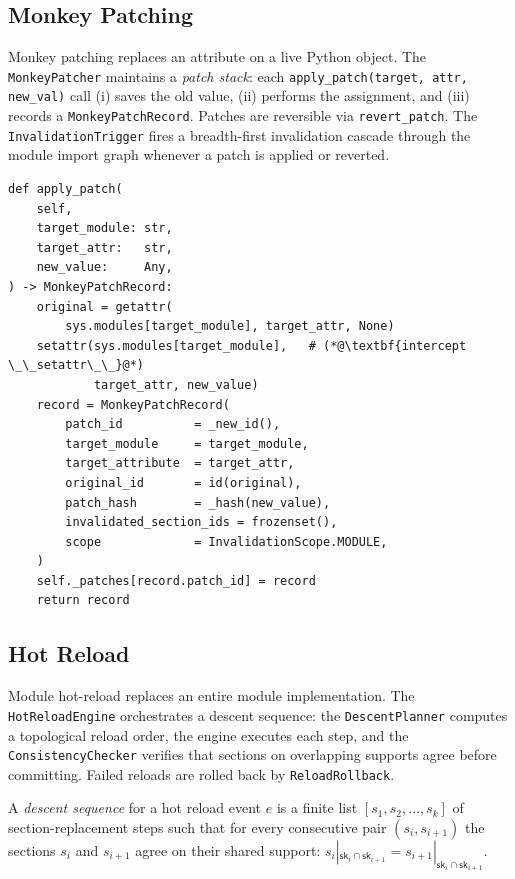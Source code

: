 \documentclass[11pt]{article}
\newcommand{\SuppKey}{\mathsf{sk}}               %
\begin{document}
\subsection{Monkey Patching}
\label{subsec:monkey}

Monkey patching replaces an attribute on a live Python object.  The
\texttt{MonkeyPatcher} maintains a \emph{patch stack}: each
\texttt{apply\_patch(target, attr, new\_val)} call (i) saves the old
value, (ii) performs the assignment, and (iii) records a
\texttt{MonkeyPatchRecord}.  Patches are reversible via
\texttt{revert\_patch}.  The \texttt{InvalidationTrigger} fires a
breadth-first invalidation cascade through the module import graph
whenever a patch is applied or reverted.

\begin{lstlisting}[style=jugeo-python,
    caption={MonkeyPatcher.apply\_patch (monkey\_patching.py, abridged)}]
def apply_patch(
    self,
    target_module: str,
    target_attr:   str,
    new_value:     Any,
) -> MonkeyPatchRecord:
    original = getattr(
        sys.modules[target_module], target_attr, None)
    setattr(sys.modules[target_module],   # (*@\textbf{intercept \_\_setattr\_\_}@*)
            target_attr, new_value)
    record = MonkeyPatchRecord(
        patch_id          = _new_id(),
        target_module     = target_module,
        target_attribute  = target_attr,
        original_id       = id(original),
        patch_hash        = _hash(new_value),
        invalidated_section_ids = frozenset(),
        scope             = InvalidationScope.MODULE,
    )
    self._patches[record.patch_id] = record
    return record
\end{lstlisting}

\subsection{Hot Reload}
\label{subsec:reload}

Module hot-reload replaces an entire module implementation.  The
\texttt{HotReloadEngine} orchestrates a descent sequence: the
\texttt{DescentPlanner} computes a topological reload order, the
engine executes each step, and the \texttt{ConsistencyChecker}
verifies that sections on overlapping supports agree before
committing.  Failed reloads are rolled back by
\texttt{ReloadRollback}.

\begin{definition}
\label{def:descent}
A \emph{descent sequence} for a hot reload event $e$ is a finite
list $[s_1, s_2, \ldots, s_k]$ of section-replacement steps such
that for every consecutive pair $(s_i, s_{i+1})$ the sections
$s_i$ and $s_{i+1}$ agree on their shared support:
$s_i|_{\SuppKey_i \cap \SuppKey_{i+1}} =
 s_{i+1}|_{\SuppKey_i \cap \SuppKey_{i+1}}$.
\end{definition}
\end{document}
